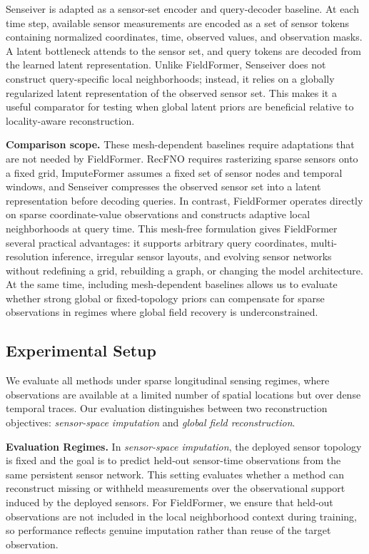 Senseiver is adapted as a sensor-set encoder and query-decoder baseline. At each time step, available sensor measurements are encoded as a set of sensor tokens containing normalized coordinates, time, observed values, and observation masks. A latent bottleneck attends to the sensor set, and query tokens are decoded from the learned latent representation. Unlike FieldFormer, Senseiver does not construct query-specific local neighborhoods; instead, it relies on a globally regularized latent representation of the observed sensor set. This makes it a useful comparator for testing when global latent priors are beneficial relative to locality-aware reconstruction.

\noindent\textbf{Comparison scope.}
These mesh-dependent baselines require adaptations that are not needed by FieldFormer. RecFNO requires rasterizing sparse sensors onto a fixed grid, ImputeFormer assumes a fixed set of sensor nodes and temporal windows, and Senseiver compresses the observed sensor set into a latent representation before decoding queries. In contrast, FieldFormer operates directly on sparse coordinate-value observations and constructs adaptive local neighborhoods at query time. This mesh-free formulation gives FieldFormer several practical advantages: it supports arbitrary query coordinates, multi-resolution inference, irregular sensor layouts, and evolving sensor networks without redefining a grid, rebuilding a graph, or changing the model architecture. At the same time, including mesh-dependent baselines allows us to evaluate whether strong global or fixed-topology priors can compensate for sparse observations in regimes where global field recovery is underconstrained.


\subsection{Experimental Setup}
\label{sec:experimental_setup}

We evaluate all methods under sparse longitudinal sensing regimes, where observations are available at a limited number of spatial locations but over dense temporal traces. Our evaluation distinguishes between two reconstruction objectives: \emph{sensor-space imputation} and \emph{global field reconstruction}.

\noindent\textbf{Evaluation Regimes.}
In \emph{sensor-space imputation}, the deployed sensor topology is fixed and the goal is to predict held-out sensor-time observations from the same persistent sensor network. This setting evaluates whether a method can reconstruct missing or withheld measurements over the observational support induced by the deployed sensors. For FieldFormer, we ensure that held-out observations are not included in the local neighborhood context during training, so performance reflects genuine imputation rather than reuse of the target observation.

